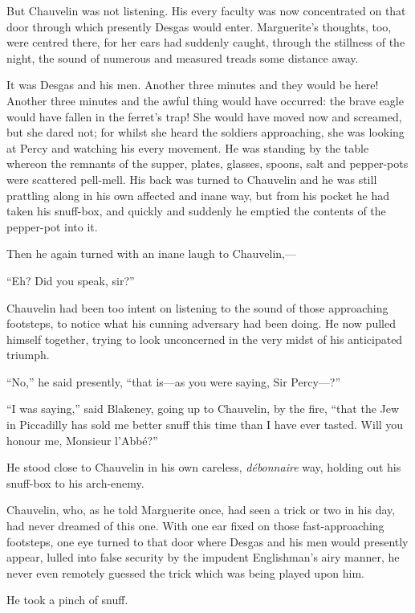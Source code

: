 \documentclass[paper=5.5in:8.5in,BCOR=7mm,twoside,DIV=calc,12pt,usegeometry,chapterprefix,endperiod,headings=big]{scrbook}
\begin{document}
But Chauvelin was not listening. His every faculty was now concentrated on that door through which presently Desgas would enter. Marguerite's thoughts, too, were centred there, for her ears had suddenly caught, through the stillness of the night, the sound of numerous and measured treads some distance away.

It was Desgas and his men. Another three minutes and they would be here! Another three minutes and the awful thing would have occurred: the brave eagle would have fallen in the ferret's trap! She would have moved now and screamed, but she dared not; for whilst she heard the soldiers approaching, she was looking at Percy and watching his every movement. He was standing by the table whereon the remnants of the supper, plates, glasses, spoons, salt and pepper-pots were scattered pell-mell. His back was turned to Chauvelin and he was still prattling along in his own affected and inane way, but from his pocket he had taken his snuff-box, and quickly and suddenly he emptied the contents of the pepper-pot into it.

Then he again turned with an inane laugh to Chauvelin,---

\enquote{Eh? Did you speak, sir?}

Chauvelin had been too intent on listening to the sound of those approaching footsteps, to notice what his cunning adversary had been doing. He now pulled himself together, trying to look unconcerned in the very midst of his anticipated triumph.

\enquote{No,} he said presently, \enquote{that is---as you were saying, Sir Percy---?}

\enquote{I was saying,} said Blakeney, going up to Chauvelin, by the fire, \enquote{that the Jew in Piccadilly has sold me better snuff this time than I have ever tasted. Will you honour me, Monsieur l'Abbé?}

He stood close to Chauvelin in his own careless, \textit{débonnaire} way, holding out his snuff-box to his arch-enemy.

Chauvelin, who, as he told Marguerite once, had seen a trick or two in his day, had never dreamed of this one. With one ear fixed on those fast-approaching footsteps, one eye turned to that door where Desgas and his men would presently appear, lulled into false security by the impudent Englishman's airy manner, he never even remotely guessed the trick which was being played upon him.

He took a pinch of snuff.
\end{document}
